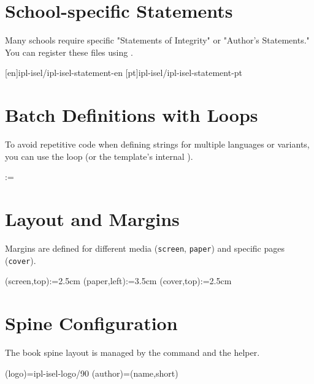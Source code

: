 \section{School-specific Statements}
\label{sec:statements}

Many schools require specific "Statements of Integrity" or "Author's Statements." You can register these files using \latexinline{\ntaddfile}.

\begin{ltx}
[en]{ipl-isel/ipl-isel-statement-en}
[pt]{ipl-isel/ipl-isel-statement-pt}
\end{ltx}

\section{Batch Definitions with Loops}
\label{sec:loops}

To avoid repetitive code when defining strings for multiple languages or variants, you can use the \latexinline{\@for} loop (or the template's internal \latexinline{\ntfor}).

\begin{ltx}
\@for\mylang:={\@LANG@LOADED}\do{%
  \committeetitlestring(\mylang):={\ToUppercase{\thecommitteetitlestring(\mylang)}}%
}
\end{ltx}

\section{Layout and Margins}
\label{sec:margins}

Margins are defined for different media (\texttt{screen}, \texttt{paper}) and specific pages (\texttt{cover}).

\begin{ltx}
\margin(screen,top):={2.5cm}
\margin(paper,left):={3.5cm}
\margin(cover,top):={2.5cm}
\end{ltx}

\section{Spine Configuration}
\label{sec:spine}

The book spine layout is managed by the \latexinline{\spine} command and the \latexinline{\SpineSetup} helper.

\begin{ltx}
\spine(logo)={ipl-isel-logo/90}
\spine(author)={\thedocauthor(name,short)}

\end{ltx}

